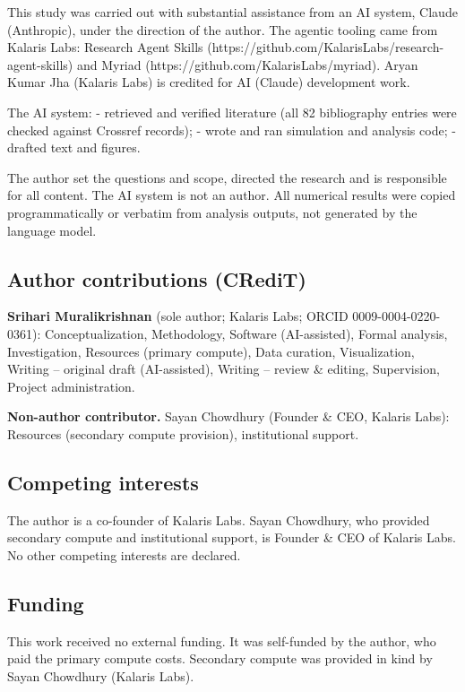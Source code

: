 \documentclass[11pt]{article}
\begin{document}
This study was carried out with substantial assistance from an AI system, Claude (Anthropic), under the direction of the author. The agentic tooling came from Kalaris Labs: Research Agent Skills (https://github.com/KalarisLabs/research-agent-skills) and Myriad (https://github.com/KalarisLabs/myriad). Aryan Kumar Jha (Kalaris Labs) is credited for AI (Claude) development work.

The AI system:
- retrieved and verified literature (all 82 bibliography entries were checked against Crossref records);
- wrote and ran simulation and analysis code;
- drafted text and figures.

The author set the questions and scope, directed the research and is responsible for all content. The AI system is not an author. All numerical results were copied programmatically or verbatim from analysis outputs, not generated by the language model.

\subsection{Author contributions (CRediT)}\label{author-contributions-credit}

\textbf{Srihari Muralikrishnan} (sole author; Kalaris Labs; ORCID 0009-0004-0220-0361): Conceptualization, Methodology, Software (AI-assisted), Formal analysis, Investigation, Resources (primary compute), Data curation, Visualization, Writing -- original draft (AI-assisted), Writing -- review \& editing, Supervision, Project administration.

\textbf{Non-author contributor.} Sayan Chowdhury (Founder \& CEO, Kalaris Labs): Resources (secondary compute provision), institutional support.

\subsection{Competing interests}\label{competing-interests}

The author is a co-founder of Kalaris Labs. Sayan Chowdhury, who provided secondary compute and institutional support, is Founder \& CEO of Kalaris Labs. No other competing interests are declared.

\subsection{Funding}\label{funding}

This work received no external funding. It was self-funded by the author, who paid the primary compute costs. Secondary compute was provided in kind by Sayan Chowdhury (Kalaris Labs).
\end{document}

